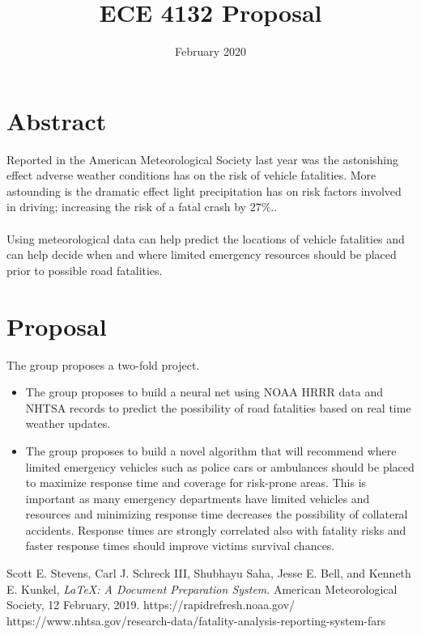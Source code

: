 \documentclass{article}
\title{ECE 4132 Proposal}
\date{February 2020}
\begin{document}
\section{Abstract}
    Reported in the American Meteorological Society last year was the astonishing effect adverse weather conditions has on the risk of vehicle fatalities.\cite{study} More astounding is the dramatic effect light precipitation has on risk factors involved in driving; increasing the risk of a fatal crash by $27\%$.\cite{study}.
    \\ \\ 
    Using meteorological data can help predict the locations of vehicle fatalities and can help decide when and where limited emergency resources should be placed prior to possible road fatalities.
 \section{Proposal}
    The group proposes a two-fold project.
    \begin{itemize}
        \item The group proposes to build a neural net using NOAA HRRR\cite{HRRR} data and NHTSA records\cite{NHTSA} to predict the possibility of road fatalities based on real time weather updates.
        \item The group proposes to build a novel algorithm that will recommend where limited emergency vehicles such as police cars or ambulances should be placed to maximize response time and coverage for risk-prone areas. This is important as many emergency departments have limited vehicles and resources and minimizing response time decreases the possibility of collateral accidents. Response times are strongly correlated also with fatality risks and faster response times should improve victims survival chances.
    \end{itemize}

\begin{thebibliography}{999}

        Scott E. Stevens, Carl J. Schreck III, Shubhayu Saha, Jesse E. Bell, and Kenneth E. Kunkel,
        \emph{\LaTeX: A Document Preparation System}.
        American Meteorological Society,
        12 February, 2019.
        https://rapidrefresh.noaa.gov/
        https://www.nhtsa.gov/research-data/fatality-analysis-reporting-system-fars
    
\end{thebibliography}
\end{document}
